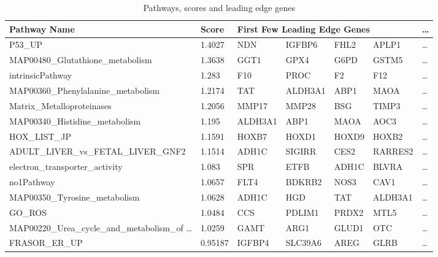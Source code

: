 \documentclass{scrartcl}
\numberwithin{figure}{section}
\numberwithin{table}{section}
\begin{document}
\begin{table}[h!]
\centering
\caption{Pathways, scores and leading edge genes}
\label{tab:legs}
\bigskip
\scriptsize
\begin{tabular}{lllllll}
\toprule
  Pathway Name                                              & Score   & \multicolumn{4}{l}{First Few Leading Edge Genes} & \dots \\
\midrule
  P53\_UP                                                   & 1.4027  & NDN      & IGFBP6  & FHL2    & APLP1   & \dots \\
  MAP00480\_Glutathione\_metabolism                         & 1.3638  & GGT1     & GPX4    & G6PD    & GSTM5   & \dots \\
  intrinsicPathway                                          & 1.283   & F10      & PROC    & F2      & F12     & \dots \\
  MAP00360\_Phenylalanine\_metabolism                       & 1.2174  & TAT      & ALDH3A1 & ABP1    & MAOA    & \dots \\
  Matrix\_Metalloproteinases                                & 1.2056  & MMP17    & MMP28   & BSG     & TIMP3   & \dots \\
  MAP00340\_Histidine\_metabolism                           & 1.195   & ALDH3A1  & ABP1    & MAOA    & AOC3    & \dots \\
  HOX\_LIST\_JP                                             & 1.1591  & HOXB7    & HOXD1   & HOXD9   & HOXB2   & \dots \\
  ADULT\_LIVER\_vs\_FETAL\_LIVER\_GNF2                      & 1.1514  & ADH1C    & SIGIRR  & CES2    & RARRES2 & \dots \\
  electron\_transporter\_activity                           & 1.083   & SPR      & ETFB    & ADH1C   & BLVRA   & \dots \\
  no1Pathway                                                & 1.0657  & FLT4     & BDKRB2  & NOS3    & CAV1    & \dots \\
  MAP00350\_Tyrosine\_metabolism                            & 1.0628  & ADH1C    & HGD     & TAT     & ALDH3A1 & \dots \\
  GO\_ROS                                                   & 1.0484  & CCS      & PDLIM1  & PRDX2   & MTL5    & \dots \\
  MAP00220\_Urea\_cycle\_and\_metabolism\_of \dots          & 1.0259  & GAMT     & ARG1    & GLUD1   & OTC     & \dots \\
  FRASOR\_ER\_UP                                            & 0.95187 & IGFBP4   & SLC39A6 & AREG    & GLRB    & \dots \\

\end{tabular}
\end{table}
\end{document}
